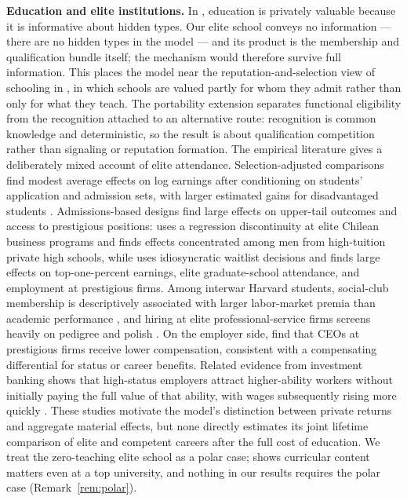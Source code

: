 \documentclass[12pt,letterpaper]{article}
\theoremstyle{definition}
\begin{document}
\textbf{Education and elite institutions.}
In \citet{spence1973signaling}, education is privately valuable because it is informative about hidden types.
Our elite school conveys no information --- there are no hidden types in the model --- and its product is the membership and qualification bundle itself; the mechanism would therefore survive full information.
This places the model near the reputation-and-selection view of schooling in \citet{macleodurquiola2019}, in which schools are valued partly for whom they admit rather than only for what they teach.
The portability extension separates functional eligibility from the recognition attached to
an alternative route: recognition is common knowledge and deterministic, so the result is
about qualification competition rather than signaling or reputation formation.
The empirical literature gives a deliberately mixed account of elite attendance.
Selection-adjusted comparisons find modest average effects on log earnings after conditioning on students' application and admission sets, with larger estimated gains for disadvantaged students \citep{dalekrueger2002}.
Admissions-based designs find large effects on upper-tail outcomes and access to prestigious positions: \citet{zimmerman2019elite} uses a regression discontinuity at elite Chilean business programs and finds effects concentrated among men from high-tuition private high schools, while \citet{chettydemingfriedman2026} uses idiosyncratic waitlist decisions and finds large effects on top-one-percent earnings, elite graduate-school attendance, and employment at prestigious firms.
Among interwar Harvard students, social-club membership is descriptively associated with larger labor-market premia than academic performance \citep{michelmanpricezimmerman2022}, and hiring at elite professional-service firms screens heavily on pedigree and polish \citep{rivera2015pedigree}.
On the employer side, \citet{fockemaugniessenruenzi2017} find that CEOs at prestigious firms receive lower compensation, consistent with a compensating differential for status or career benefits.
Related evidence from investment banking shows that high-status employers attract higher-ability workers without initially paying the full value of that ability, with wages subsequently rising more quickly \citep{bidwellwonbarbulescumollick2015}.
These studies motivate the model's distinction between private returns and aggregate material effects, but none directly estimates its joint lifetime comparison of elite and competent careers after the full cost of education.
We treat the zero-teaching elite school as a polar case; \citet{arteaga2018} shows curricular content matters even at a top university, and nothing in our results requires the polar case (Remark~\ref{rem:polar}).
\end{document}
